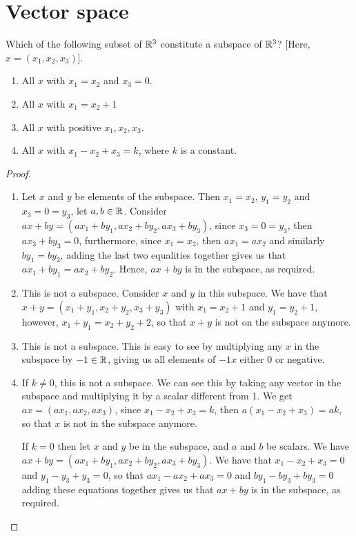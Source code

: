 \section{Vector space}


\begin{exercise}{4}
Which of the following subset of $\mathbb{R}^3$ constitute a subspace of $\mathbb{R}^3$? [Here, $x=(x_1,x_2,x_3)$].
\begin{enumerate}
    \item All $x$ with $x_1=x_2$ and $x_3=0$.
    \item All $x$ with $x_1=x_2+1$
    \item All $x$ with positive $x_1,x_2,x_3$.
    \item All $x$ with $x_1-x_2+x_3=k$, where $k$ is a constant.
\end{enumerate}
\end{exercise}
\begin{proof}
\begin{enumerate}
    \item Let $x$ and $y$ be elements of the subspace. Then $x_1=x_2$, $y_1=y_2$ and $x_3=0=y_3$, let $a,b\in\mathbb{R}$. Consider $ax+by=(ax_1+by_1,ax_2+by_2,ax_3+by_3)$, since $x_3=0=y_3$, then $ax_3+by_3=0$, furthermore, since $x_1=x_2$, then $ax_1=ax_2$ and similarly $by_1=by_2$, adding the last two equalities together gives us that $ax_1+by_1=ax_2+by_2$. Hence, $ax+by$ is in the subspace, as required.
    \item This is not a subspace. Consider $x$ and $y$ in this subspace. We have that $x+y=(x_1+y_1,x_2+y_2,x_3+y_3)$ with $x_1=x_2+1$ and $y_1=y_2+1$, however, $x_1+y_1=x_2+y_2+2$, so that $x+y$ is not on the subspace anymore.
    \item This is not a subspace. This is easy to see by multiplying any $x$ in the subspace by $-1\in\mathbb{R}$, giving us all elements of $-1x$ either 0 or negative.
    \item If $k\neq 0$, this is not a subspace. We can see this by taking any vector in the subspace and multiplying it by a scalar different from 1. We get $ax=(ax_1,ax_2,ax_3)$, since $x_1-x_2+x_3=k$, then $a(x_1-x_2+x_3)=ak$, so that $x$ is not in the subspace anymore.

    If $k=0$ then let $x$ and $y$ be in the subspace, and $a$ and $b$ be scalars. We have $ax+by=(ax_1+by_1,ax_2+by_2,ax_3+by_3)$. We have that $x_1-x_2+x_3=0$ and $y_1-y_3+y_3=0$, so that $ax_1-ax_2+ax_3=0$ and $by_1-by_3+by_3=0$ adding these equations together gives us that $ax+by$ is in the subspace, as required.
\end{enumerate}
\end{proof}


